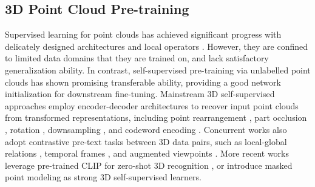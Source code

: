\documentclass[sigconf, screen]{acmart}
\begin{document}
 
\subsection{3D Point Cloud Pre-training}
Supervised learning for point clouds has achieved significant progress with delicately designed architectures \cite{wang2019dynamic,qi2017pointnet++,qi2017pointnet,guo2021pct} and local operators \cite{xu2021image2point,ma2022rethinking, li2018pointcnn}. 
However, they are confined to limited data domains \cite{wu20153d, uy2019revisiting} that they are trained on, and lack satisfactory generalization ability.
In contrast, self-supervised pre-training via unlabelled point clouds \cite{zhang2021self} has shown promising transferable ability, providing a good network initialization for downstream fine-tuning. Mainstream 3D self-supervised approaches employ encoder-decoder architectures to recover input point clouds from transformed representations, including point rearrangement \cite{sauder2019self}, part occlusion \cite{wang2021unsupervised}, rotation \cite{poursaeed2020self}, downsampling \cite{li2019pu}, and codeword encoding \cite{yang2018foldingnet}. Concurrent works also adopt contrastive pre-text tasks between 3D data pairs, such as local-global relations \cite{fu2022distillation, rao2020global, afham2022crosspoint}, temporal frames \cite{huang2021spatio}, and augmented viewpoints \cite{xie2020pointcontrast}. More recent works leverage pre-trained CLIP \cite{radford2021learning} for zero-shot 3D recognition \cite{zhu2022pointclip, zhang2022pointclip,xu2021image2point}, or introduce masked point modeling \cite{pang2022masked, zhang2022point, yu2022point} as strong 3D self-supervised learners. 
\end{document}
